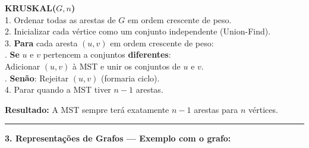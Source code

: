 \documentclass[12pt,a4paper]{article}
\begin{document}
\begin{tcolorbox}[colback=white, colframe=black, fontupper=\small]
\textbf{KRUSKAL($G, n$)}\\
1. Ordenar todas as arestas de $G$ em ordem crescente de peso.\\
2. Inicializar cada vértice como um conjunto independente (Union-Find).\\
3. \textbf{Para} cada aresta $(u, v)$ em ordem crescente de peso:\\
. \textbf{Se} $u$ e $v$ pertencem a conjuntos \textbf{diferentes}:\\
\quad\quad Adicionar $(u, v)$ à MST e unir os conjuntos de $u$ e $v$.\\
. \textbf{Senão}: Rejeitar $(u, v)$ (formaria ciclo).\\
4. Parar quando a MST tiver $n - 1$ arestas.
\end{tcolorbox}

\textbf{Resultado:} A MST sempre terá exatamente $n - 1$ arestas para $n$ vértices.

\vspace{0.4cm}
\hrule
\vspace{0.4cm}

\noindent\textbf{3. Representações de Grafos — Exemplo com o grafo:}

\begin{center}
\end{center}
\end{document}
